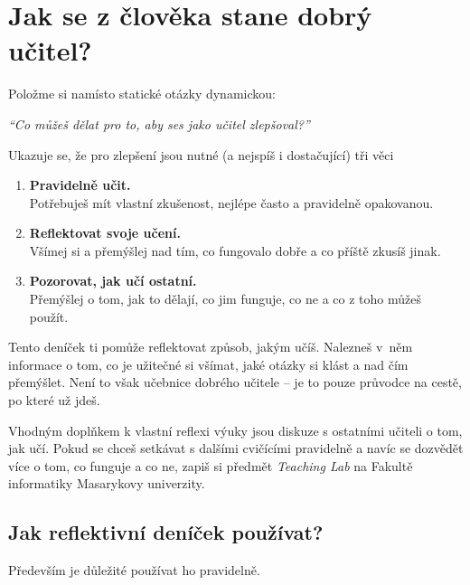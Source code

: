 
\chapter*{Jak se z člověka stane dobrý učitel?}

\vspace*{1em}
Položme si namísto statické otázky dynamickou:

\vspace*{1em}
\textit{\large \enquote{Co můžeš dělat pro to, aby ses jako učitel zlepšoval?}}

\vspace*{1em}
Ukazuje se, že pro zlepšení jsou nutné (a nejspíš i dostačující) tři věci\footnotemark
{}
\begin{enumerate}
\item \textbf{Pravidelně učit.} \\Potřebuješ mít vlastní zkušenost, nejlépe často a pravidelně opakovanou.
\item \textbf{Reflektovat svoje učení.} \\Všímej si a přemýšlej nad tím, co fungovalo dobře a co příště zkusíš jinak.
\item \textbf{Pozorovat, jak učí ostatní.} \\Přemýšlej o tom, jak to dělají, co jim funguje, co ne a co z toho můžeš použít.
\end{enumerate}

Tento deníček ti pomůže reflektovat způsob, jakým učíš. Nalezneš v~něm informace o tom, co je užitečné si všímat, jaké otázky si klást a nad čím přemýšlet. Není to však učebnice dobrého učitele -- je to pouze průvodce na cestě, po které už jdeš.

Vhodným doplňkem k vlastní reflexi výuky jsou diskuze s ostatními učiteli o tom, jak učí. Pokud se chceš setkávat s dalšími cvičícími pravidelně a navíc se dozvědět více o tom, co funguje a co ne, zapiš si předmět \textit{Teaching Lab} na Fakultě informatiky Masarykovy univerzity.

\newpage
\section*{Jak reflektivní deníček používat?}

Především je důležité používat ho pravidelně.

